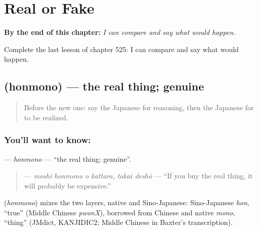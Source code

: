 
\chapter{Real or Fake}
\label{ch:ja-real-or-fake}

\begin{chapteropening}
\textbf{By the end of this chapter:} \emph{I can compare and say what would happen.}

Complete the last lesson of chapter 525: I can compare and say what would happen.
\end{chapteropening}

\section[\texorpdfstring{\ja{ほんもの} (honmono)}{ほんもの (honmono)}]{ (honmono) — the real thing; genuine}

\label{lesson:JA-C525-honmono}



\begin{quote}
Before the new one: say the Japanese for reasoning, then the Japanese for to be realized.
\end{quote}

\subsection*{You'll want to know: }
\textbf{} — \emph{honmono} — \textquotedblleft{}the real thing; genuine\textquotedblright{}.

\begin{quote}
\textbf{  } — \emph{moshi honmono o kattara, takai deshō} — \textquotedblleft{}If you buy the real thing, it will probably be expensive.\textquotedblright{}
\end{quote}

\begin{cousinweb}
\textbf{} (\emph{honmono}) mixes the two layers, native and Sino-Japanese: Sino-Japanese \emph{hon}, \textquotedblleft{}true\textquotedblright{} (Middle Chinese \emph{pwonX}), borrowed from Chinese and native \emph{mono}, \textquotedblleft{}thing\textquotedblright{} (JMdict, KANJIDIC2; Middle Chinese in Baxter's transcription).
\end{cousinweb}

